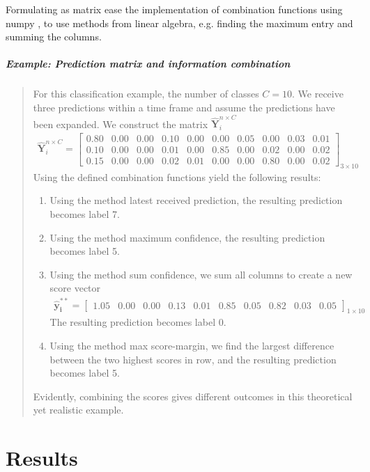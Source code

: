 Formulating as matrix ease the implementation of combination functions using \gls{numpy} \cite{oliphant_numpy:_2006}, to use methods from linear algebra, e.g. finding the maximum entry and summing the columns.
\subparagraph{Example: Prediction matrix and information combination} 
\blockquote[]{	 	
	For this classification example, the number of classes $C=10$. We receive three predictions within a time frame and assume the predictions have been expanded.
	We construct the matrix $ \bm{\hat{Y}}_{i}^{n \times C} $
	\begin{align*}
	\bm{\hat{Y}}_{i}^{n \times C} =
	\begin{bmatrix}
	0.80 & 0.00 & 0.00 & 0.10 & 0.00 & 0.00 & 0.05 & 0.00 & 0.03 & 0.01 \\
	0.10 & 0.00 & 0.00 & 0.01 & 0.00 & 0.85 & 0.00 & 0.02 & 0.00 & 0.02 \\
	0.15 & 0.00 & 0.00 & 0.02 & 0.01 & 0.00 & 0.00 & 0.80 & 0.00 & 0.02 
	\end{bmatrix}_{3 \times 10}
	\end{align*}
	Using the defined combination functions yield the following results:
	\begin{enumerate}
		\item Using the method latest received prediction, the resulting prediction becomes label 7.
		\item Using the method maximum confidence, the resulting prediction becomes label 5.
		\item Using the method sum confidence, we sum all columns to create a new score vector
		\begin{align*}
		\bm{\hat{y}^{**}_{i}} = 
		\begin{bmatrix}
		1.05 & 0.00 & 0.00 & 0.13 & 0.01 & 0.85 & 0.05 & 0.82 & 0.03 & 0.05
		\end{bmatrix}_{1 \times 10}
		\end{align*}
		The resulting prediction becomes label 0.
		\item Using the method max score-margin, we find the largest difference between the two highest scores in row, and the resulting prediction becomes label 5.
	\end{enumerate}
	Evidently, combining the scores gives different outcomes in this theoretical yet realistic example.
	
}

\section{Results} \label{sec:edge-results}

